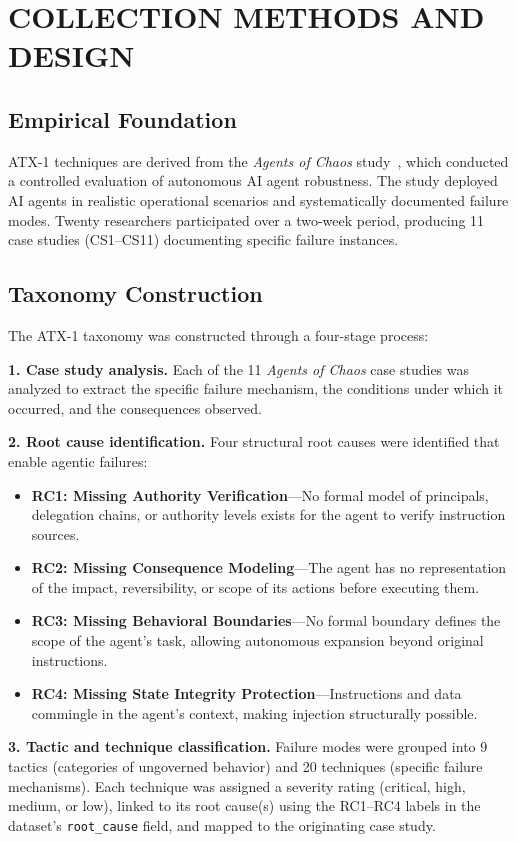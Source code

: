 \documentclass{IEEEoj-data}
\begin{document}
\section*{COLLECTION METHODS AND DESIGN}

\subsection*{Empirical Foundation}

ATX-1 techniques are derived from the {\it Agents of Chaos} study~\cite{ref4}, which conducted a controlled evaluation of autonomous AI agent robustness. The study deployed AI agents in realistic operational scenarios and systematically documented failure modes. Twenty researchers participated over a two-week period, producing 11 case studies (CS1--CS11) documenting specific failure instances.

\subsection*{Taxonomy Construction}

The ATX-1 taxonomy was constructed through a four-stage process:

{\bf 1. Case study analysis.} Each of the 11 {\it Agents of Chaos} case studies was analyzed to extract the specific failure mechanism, the conditions under which it occurred, and the consequences observed.

{\bf 2. Root cause identification.} Four structural root causes were identified that enable agentic failures:
\begin{itemize}
\item {\bf RC1: Missing Authority Verification}---No formal model of principals, delegation chains, or authority levels exists for the agent to verify instruction sources.
\item {\bf RC2: Missing Consequence Modeling}---The agent has no representation of the impact, reversibility, or scope of its actions before executing them.
\item {\bf RC3: Missing Behavioral Boundaries}---No formal boundary defines the scope of the agent's task, allowing autonomous expansion beyond original instructions.
\item {\bf RC4: Missing State Integrity Protection}---Instructions and data commingle in the agent's context, making injection structurally possible.
\end{itemize}

{\bf 3. Tactic and technique classification.} Failure modes were grouped into 9 tactics (categories of ungoverned behavior) and 20 techniques (specific failure mechanisms). Each technique was assigned a severity rating (critical, high, medium, or low), linked to its root cause(s) using the RC1--RC4 labels in the dataset's \texttt{root\_cause} field, and mapped to the originating case study.
\end{document}
